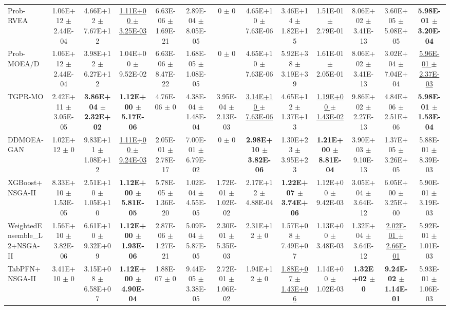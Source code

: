 \documentclass[conference]{IEEEtran}
\begin{document}
\begin{table}[htbp]
{\begin{tabular}{lcccccccccccc}
Prob-RVEA & 1.06E+12 $\pm$ 2.44E-04 & 4.66E+12 $\pm$ 7.67E+12 & \underline{1.11E+00 $\pm$ 3.25E-03} & 6.63E-06 $\pm$ 1.69E-21 & 2.89E-04 $\pm$ 8.05E-05 & 0 $\pm$ 0 & 4.65E+10 $\pm$ 7.63E-06 & 3.46E+14 $\pm$ 1.82E+15 & 1.51E-01 $\pm$ 2.79E-01 & 8.06E+02 $\pm$ 3.41E-13 & 3.60E+05 $\pm$ 5.08E+05 & \textbf{5.98E-01 $\pm$ 3.20E-04} \\
Prob-MOEA/D & 1.06E+12 $\pm$ 2.44E-04 & 3.98E+12 $\pm$ 6.27E+12 & 1.04E+00 $\pm$ 9.52E-02 & 6.63E-06 $\pm$ 8.47E-22 & 1.68E-05 $\pm$ 1.08E-05 & 0 $\pm$ 0 & 4.65E+10 $\pm$ 7.63E-06 & 5.92E+38 $\pm$ 3.19E+39 & 1.61E-01 $\pm$ 2.05E-01 & 8.06E+02 $\pm$ 3.41E-13 & 3.02E+04 $\pm$ 7.04E+04 & \underline{5.96E-01 $\pm$ 2.37E-03} \\
TGPR-MO & 2.42E+11 $\pm$ 3.05E-05 & \textbf{3.86E+04 $\pm$ 2.32E+02} & \textbf{1.12E+00 $\pm$ 5.17E-06} & 4.76E-06 $\pm$ 0 & 4.38E-04 $\pm$ 1.48E-04 & 3.95E-04 $\pm$ 2.13E-03 & \underline{3.14E+10 $\pm$ 7.63E-06} & 4.65E+12 $\pm$ 1.37E+13 & \underline{1.19E+00 $\pm$ 1.43E-02} & 9.86E+02 $\pm$ 2.27E-13 & 4.84E+06 $\pm$ 2.51E+06 & \textbf{5.98E-01 $\pm$ 1.53E-04} \\
DDMOEA-GAN & 1.02E+12 $\pm$ 0 & 9.83E+11 $\pm$ 1.08E+12 & \underline{1.11E+00 $\pm$ 9.24E-03} & 2.05E-01 $\pm$ 2.78E-17 & 7.00E-01 $\pm$ 6.79E-02 & 0 $\pm$ 0 & \textbf{2.98E+10 $\pm$ 3.82E-06} & 1.30E+23 $\pm$ 3.95E+23 & \textbf{1.21E+00 $\pm$ 8.81E-04} & 3.90E+03 $\pm$ 9.10E-13 & 1.37E+05 $\pm$ 3.26E+05 & 5.88E-01 $\pm$ 8.39E-03 \\
XGBoost+NSGA-II & 8.33E+10 $\pm$ 1.53E-05 & 2.51E+10 $\pm$ 1.05E+10 & \textbf{1.12E+00 $\pm$ 5.81E-05} & 5.78E-05 $\pm$ 1.36E-20 & 1.02E-04 $\pm$ 4.55E-05 & 1.72E-01 $\pm$ 1.02E-02 & 2.17E+12 $\pm$ 4.88E-04 & \textbf{1.22E+07 $\pm$ 3.74E+06} & 1.12E+00 $\pm$ 9.42E-03 & 3.05E+04 $\pm$ 3.64E-12 & 6.05E+00 $\pm$ 3.25E+00 & 5.90E-01 $\pm$ 3.19E-03 \\
WeightedEnsemble\_L2+NSGA-II & 1.56E+10 $\pm$ 3.82E-06 & 6.61E+10 $\pm$ 9.32E+09 & \textbf{1.12E+00 $\pm$ 1.93E-06} & 2.87E-06 $\pm$ 1.27E-21 & 5.09E-04 $\pm$ 5.87E-05 & 2.30E-01 $\pm$ 5.35E-03 & 2.31E+12 $\pm$ 0 & 1.57E+08 $\pm$ 7.49E+07 & 1.13E+00 $\pm$ 3.48E-03 & 1.32E+04 $\pm$ 3.64E-12 & \underline{2.02E-01 $\pm$ 2.66E-01} & 5.92E-01 $\pm$ 1.01E-03 \\
TabPFN+NSGA-II & 3.41E+10 $\pm$ 0 & 3.15E+08 $\pm$ 6.58E+07 & \textbf{1.12E+00 $\pm$ 4.90E-04} & 1.88E-07 $\pm$ 0 & 9.44E-05 $\pm$ 3.38E-05 & 2.72E-01 $\pm$ 1.06E-02 & 1.94E+12 $\pm$ 0 & \underline{1.88E+07 $\pm$ 1.43E+06} & 1.14E+00 $\pm$ 1.02E-03 & \textbf{1.32E+02 $\pm$ 0} & \textbf{9.24E-02 $\pm$ 1.14E-01} & 5.93E-01 $\pm$ 1.06E-03 \\
\bottomrule
\end{tabular}%
}
\end{table}
\end{document}
